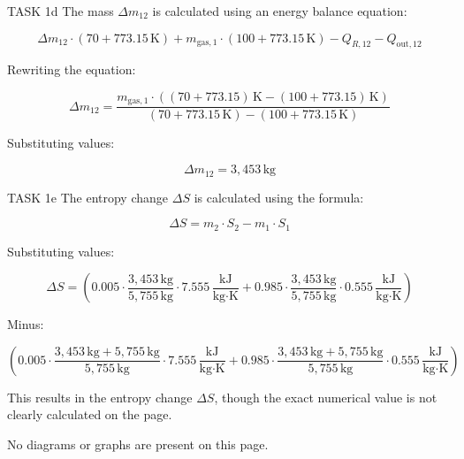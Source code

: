 TASK 1d  
The mass \( \Delta m_{12} \) is calculated using an energy balance equation:  

\[
\Delta m_{12} \cdot \left( 70 + 773.15 \, \text{K} \right) + m_{\text{gas},1} \cdot \left( 100 + 773.15 \, \text{K} \right) - Q_{R,12} - Q_{\text{out},12}
\]

Rewriting the equation:  

\[
\Delta m_{12} = \frac{m_{\text{gas},1} \cdot \left( (70 + 773.15) \, \text{K} - (100 + 773.15) \, \text{K} \right)}{\left( 70 + 773.15 \, \text{K} \right) - \left( 100 + 773.15 \, \text{K} \right)}
\]

Substituting values:  

\[
\Delta m_{12} = 3,453 \, \text{kg}
\]

TASK 1e  
The entropy change \( \Delta S \) is calculated using the formula:  

\[
\Delta S = m_2 \cdot S_2 - m_1 \cdot S_1
\]

Substituting values:  

\[
\Delta S = \left( 0.005 \cdot \frac{3,453 \, \text{kg}}{5,755 \, \text{kg}} \cdot 7.555 \, \frac{\text{kJ}}{\text{kg·K}} + 0.985 \cdot \frac{3,453 \, \text{kg}}{5,755 \, \text{kg}} \cdot 0.555 \, \frac{\text{kJ}}{\text{kg·K}} \right)
\]

Minus:  

\[
\left( 0.005 \cdot \frac{3,453 \, \text{kg} + 5,755 \, \text{kg}}{5,755 \, \text{kg}} \cdot 7.555 \, \frac{\text{kJ}}{\text{kg·K}} + 0.985 \cdot \frac{3,453 \, \text{kg} + 5,755 \, \text{kg}}{5,755 \, \text{kg}} \cdot 0.555 \, \frac{\text{kJ}}{\text{kg·K}} \right)
\]

This results in the entropy change \( \Delta S \), though the exact numerical value is not clearly calculated on the page.  

No diagrams or graphs are present on this page.